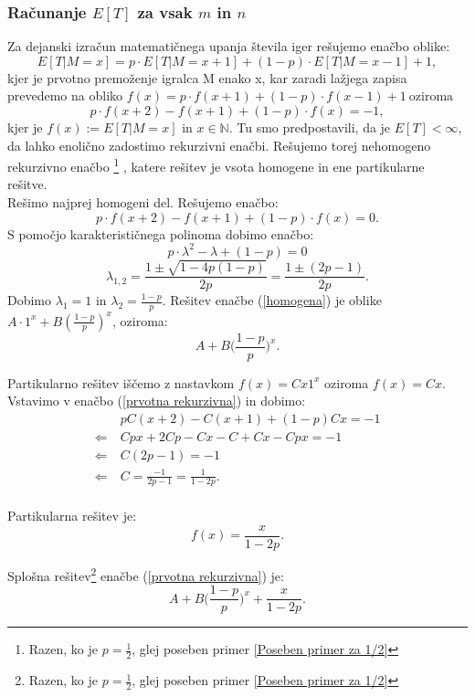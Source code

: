 \documentclass[12pt, a4paper]{article}
\begin{document}
\subsubsection{Računanje $E[T]$ za vsak $m$ in $n$}
Za dejanski izračun matematičnega upanja števila iger rešujemo enačbo oblike: $$E[T|M=x] = p\cdot E[T|M=x+1] + (1-p)\cdot E[T|M=x-1] + 1,$$ kjer je prvotno premoženje igralca M enako x, kar zaradi lažjega zapisa prevedemo na obliko $f(x) = p\cdot f(x+1) + (1-p) \cdot f(x-1) + 1 ~ \textrm{oziroma} $ 
\begin{equation}
\label{prvotna rekurzivna}
p\cdot f(x+2) - f(x+1) + (1-p)\cdot f(x) = -1,
\end{equation}
kjer je $f(x):=E[T|M=x]$ in $x \in \mathbb{N}$. Tu smo predpostavili, da je $E[T] < \infty$, da lahko enolično zadostimo rekurzivni enačbi. 
Rešujemo torej nehomogeno rekurzivno enačbo \footnote{Razen, ko je $p=\frac{1}{2}$, glej poseben primer \ref{Poseben primer za 1/2} } , katere rešitev je vsota homogene in ene partikularne rešitve. \\

Rešimo najprej homogeni del. Rešujemo enačbo: 
\begin{equation}
\label{homogena}
p\cdot f(x+2) - f(x+1) + (1-p)\cdot f(x) = 0.
\end{equation}
S pomočjo karakterističnega polinoma dobimo enačbo: $$p\cdot  \lambda ^2 - \lambda + (1-p) = 0$$ $$\lambda _{1, 2}= \frac{1 \pm \sqrt{1 - 4p(1-p)}}{2p} = \frac{1 \pm (2p-1)}{2p}.$$
Dobimo $\lambda _{1} = 1$ in $\lambda _{2} = \frac{1-p}{p}$. Rešitev enačbe (\ref{homogena}) je oblike $A\cdot 1^x + B(\frac{1-p}{p})^x$, oziroma: $$A+ B \bigg( \frac{1-p}{p} \bigg )^x. $$

Partikularno rešitev iščemo z nastavkom $f(x)= Cx1^x$ oziroma $f(x)= Cx$. Vstavimo v enačbo (\ref{prvotna rekurzivna}) in dobimo: 
\begin{equation*}
\begin{split}
 &~pC(x+2)-C(x+1)+(1-p)Cx=-1\\
\Leftarrow & ~Cpx+2Cp-Cx-C+Cx-Cpx=-1 \\
\Leftarrow & ~C(2p-1)=-1\\
\Leftarrow & ~C=\frac{-1}{2p-1} = \frac{1}{1-2p}.\\
\end{split}
\end{equation*}
 
Partikularna rešitev je: $$f(x)=\frac{x}{1-2p}.$$

Splošna rešitev\footnote{Razen, ko je $p=\frac{1}{2}$, glej poseben primer \ref{Poseben primer za 1/2} } enačbe (\ref{prvotna rekurzivna}) je: $$A + B\bigg( \frac{1-p}{p} \bigg )^x+\frac{x}{1-2p}.$$
\end{document}

